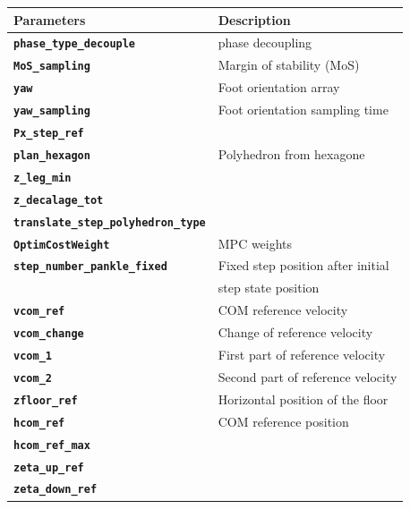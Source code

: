 \documentclass[12pt,oneside,notitlepage,abstracton,a4paper]{scrartcl}
\begin{document}
\begin{table}[!htbp] 
\begin{center}
\begin{tabular}{|l|l|}
  \hline
  \rowcolor{green!25}\bf {\small Parameters}      & \bf {\small Description}  \\ \hline 
 \textbf{\texttt{phase\_type\_decouple}}         & phase decoupling \\ \hline 
 \textbf{\texttt{MoS\_sampling}}         & Margin of stability (MoS) \\ \hline 
 \textbf{\texttt{yaw}}         &  Foot orientation array\\ \hline 
 \textbf{\texttt{yaw\_sampling}}         & Foot orientation sampling time\\ \hline 
 \textbf{\texttt{Px\_step\_ref}}         &  \\ \hline 
 \textbf{\texttt{plan\_hexagon}}         &  Polyhedron from hexagone \\ \hline 
 \textbf{\texttt{z\_leg\_min}}         &  \\ \hline 
 \textbf{\texttt{z\_decalage\_tot}}         &  \\ \hline 
 \textbf{\texttt{translate\_step\_polyhedron\_type}}         &  \\ \hline 
 \textbf{\texttt{OptimCostWeight}}         & MPC weights  \\ \hline 
 \textbf{\texttt{step\_number\_pankle\_fixed}}         &  Fixed step position after initial\\   
         &  step state position\\ \hline 
 \textbf{\texttt{vcom\_ref}}         & COM reference velocity \\ \hline 
 \textbf{\texttt{vcom\_change}}         &  Change of reference velocity\\ \hline 
 \textbf{\texttt{vcom\_1}}         & First part of reference velocity \\ \hline 
 \textbf{\texttt{vcom\_2}}         &  Second part of reference velocity\\ \hline 
 \textbf{\texttt{zfloor\_ref}}         &  Horizontal position of the floor\\ \hline 
 \textbf{\texttt{hcom\_ref}}         & COM reference position \\ \hline 
 \textbf{\texttt{hcom\_ref\_max}}         &  \\ \hline 
 \textbf{\texttt{zeta\_up\_ref}}         &  \\ \hline 
 \textbf{\texttt{zeta\_down\_ref}}         &  \\ \hline 

\end{tabular}
\end{center}
\end{table}
\end{document}
